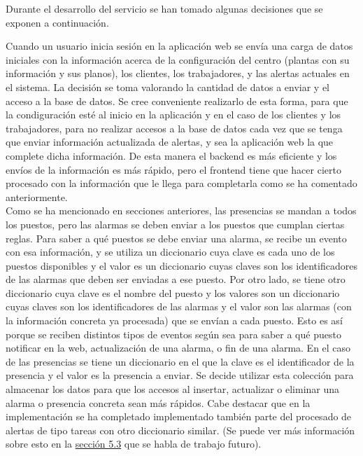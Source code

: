Durante el desarrollo del servicio se han tomado algunas decisiones que se exponen a continuación.

Cuando un usuario inicia sesión en la aplicación web se envía una carga de datos iniciales con la información acerca de la configuración del centro (plantas con su información y sus planos), los clientes, los trabajadores, y las alertas actuales en el sistema. La decisión se toma valorando la cantidad de datos a enviar y el acceso a la base de datos. Se cree conveniente realizarlo de esta forma, para que la condiguración esté al inicio en la aplicación y en el caso de los clientes y los trabajadores, para no realizar accesos a la base de datos cada vez que se tenga que enviar información actualizada de alertas, y sea la aplicación web la que complete dicha información. De esta manera el backend es más eficiente y los envíos de la información es más rápido, pero el frontend tiene que hacer cierto procesado con la información que le llega para completarla como se ha comentado anteriormente.\\

Como se ha mencionado en secciones anteriores, las presencias se mandan a todos los puestos, pero las alarmas se deben enviar a los puestos que cumplan ciertas reglas.
Para saber a qué puestos se debe enviar una alarma, se recibe un evento con esa información, y se utiliza un diccionario cuya clave es cada uno de los puestos disponibles y el valor es un diccionario cuyas claves son los identificadores de las alarmas que deben ser enviadas a ese puesto. Por otro lado, se tiene otro diccionario cuya clave es el nombre del puesto y los valores son un diccionario cuyas claves son los identificadores de las alarmas y el valor son las alarmas (con la información concreta ya procesada) que se envían a cada puesto. Esto es así porque se reciben distintos tipos de eventos según sea para saber a qué puesto notificar en la web, actualización de una alarma, o fin de una alarma. 
En el caso de las presencias se tiene un diccionario en el que la clave es el identificador de la presencia y el valor es la presencia a enviar.
Se decide utilizar esta colección para almacenar los datos para que los accesos al insertar, actualizar o eliminar una alarma o presencia concreta sean más rápidos.
Cabe destacar que en la implementación se ha completado implementado también parte del procesado de alertas de tipo tareas con otro diccionario similar. (Se puede ver más información sobre esto en la \hyperref[section-trabajo-futuro]{sección 5.3} que se habla de trabajo futuro).


